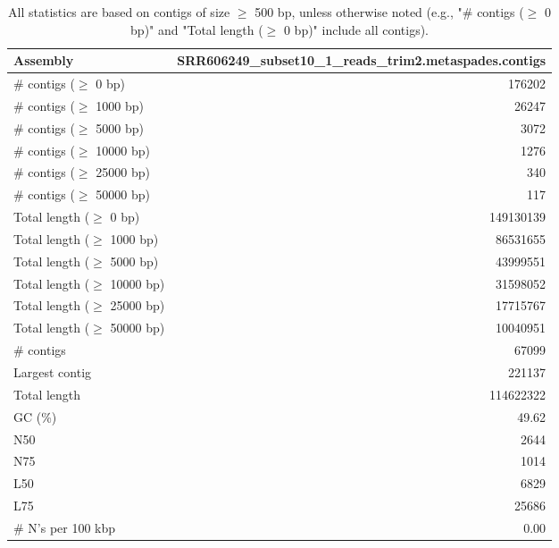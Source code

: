 \documentclass[12pt,a4paper]{article}
\begin{document}
\begin{table}[ht]
\begin{center}
\caption{All statistics are based on contigs of size $\geq$ 500 bp, unless otherwise noted (e.g., "\# contigs ($\geq$ 0 bp)" and "Total length ($\geq$ 0 bp)" include all contigs).}
\begin{tabular}{|l*{1}{|r}|}
\hline
Assembly & SRR606249\_subset10\_1\_reads\_trim2.metaspades.contigs \\ \hline
\# contigs ($\geq$ 0 bp) & 176202 \\ \hline
\# contigs ($\geq$ 1000 bp) & 26247 \\ \hline
\# contigs ($\geq$ 5000 bp) & 3072 \\ \hline
\# contigs ($\geq$ 10000 bp) & 1276 \\ \hline
\# contigs ($\geq$ 25000 bp) & 340 \\ \hline
\# contigs ($\geq$ 50000 bp) & 117 \\ \hline
Total length ($\geq$ 0 bp) & 149130139 \\ \hline
Total length ($\geq$ 1000 bp) & 86531655 \\ \hline
Total length ($\geq$ 5000 bp) & 43999551 \\ \hline
Total length ($\geq$ 10000 bp) & 31598052 \\ \hline
Total length ($\geq$ 25000 bp) & 17715767 \\ \hline
Total length ($\geq$ 50000 bp) & 10040951 \\ \hline
\# contigs & 67099 \\ \hline
Largest contig & 221137 \\ \hline
Total length & 114622322 \\ \hline
GC (\%) & 49.62 \\ \hline
N50 & 2644 \\ \hline
N75 & 1014 \\ \hline
L50 & 6829 \\ \hline
L75 & 25686 \\ \hline
\# N's per 100 kbp & 0.00 \\ \hline
\end{tabular}
\end{center}
\end{table}
\end{document}
